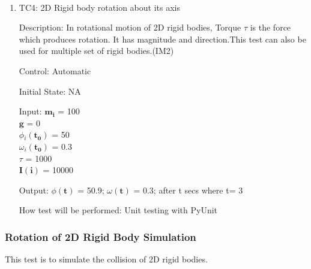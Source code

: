 \documentclass[12pt, titlepage]{article}
\begin{document}
\paragraph{}
\begin{enumerate}
	
	\item{TC4: 2D Rigid body rotation about its axis\\}
	
	Description: In rotational motion of 2D rigid bodies, Torque $\tau$ is the force which produces rotation. It has magnitude and direction.This test can also be used for multiple set of rigid bodies.(IM2)
	
	Control: Automatic
	
	Initial State: NA
	
	Input: $\mathbf{m_i}$$\mathbf{}$ = 100\\
	\hspace*{1.3cm}$\mathbf{g}$$\mathbf{}$ = 0\\
	\hspace*{1.3cm}$\phi$$_i\mathbf{(t_0)}$ = 50\\
	\hspace*{1.3cm}$\omega$$_i\mathbf{(t_0)}$$ \mathbf{}$ = 0.3\\
	\hspace*{1.3cm}$\tau$$\mathbf{}$ = 1000 \\
	\hspace*{1.3cm}$\mathbf{I}$$\mathbf{(i)}$ = 10000
	
	Output:  $\phi$$\mathbf{(t)}$ = 50.9;
	$\omega$$\mathbf{(t)}$ = 0.3; after t secs where t= 3 
	
	How test will be performed: Unit testing with PyUnit



\end{enumerate}

\subsubsection{Rotation of 2D Rigid Body Simulation}
This test is to simulate the collision of 2D rigid bodies.
\end{document}
